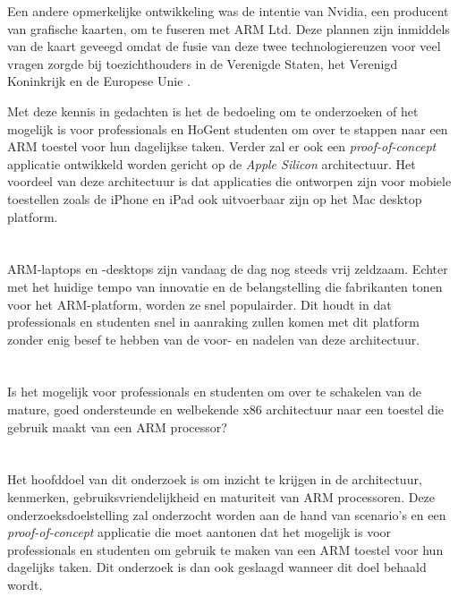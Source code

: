 Een andere opmerkelijke ontwikkeling was de intentie van Nvidia, een producent van grafische kaarten, om te fuseren met ARM Ltd. Deze plannen zijn inmiddels van de kaart geveegd omdat de fusie van deze twee technologiereuzen voor veel vragen zorgde bij toezichthouders in de Verenigde Staten, het Verenigd Koninkrijk en de Europese Unie \autocite{Dowd2022}. 

Met deze kennis in gedachten is het de bedoeling om te onderzoeken of het mogelijk is voor professionals en HoGent studenten om over te stappen naar een ARM toestel voor hun dagelijkse taken. Verder zal er ook een \textit{proof-of-concept} applicatie ontwikkeld worden gericht op de \textit{Apple Silicon} architectuur. Het voordeel van deze architectuur is dat applicaties die ontworpen zijn voor mobiele toestellen zoals de iPhone en iPad ook uitvoerbaar zijn op het Mac desktop platform.

\section{}
\label{sec:probleemstelling}

ARM-laptops en -desktops zijn vandaag de dag nog steeds vrij zeldzaam. Echter met het huidige tempo van innovatie en de belangstelling die fabrikanten tonen voor het ARM-platform, worden ze snel populairder. Dit houdt in dat professionals en studenten snel in aanraking zullen komen met dit platform zonder enig besef te hebben van de voor- en nadelen van deze architectuur. 

\section{}
\label{sec:onderzoeksvraag}

Is het mogelijk voor professionals en studenten om over te schakelen van de mature, goed ondersteunde en welbekende x86 architectuur naar een toestel die gebruik maakt van een ARM processor? 

\section{}
\label{sec:onderzoeksdoelstelling}

Het hoofddoel van dit onderzoek is om inzicht te krijgen in de architectuur, kenmerken, gebruiksvriendelijkheid en maturiteit van ARM processoren. Deze onderzoeksdoelstelling zal onderzocht worden aan de hand van scenario’s en een \textit{proof-of-concept} applicatie die moet aantonen dat het mogelijk is voor professionals en studenten om gebruik te maken van een ARM toestel voor hun dagelijks taken. Dit onderzoek is dan ook geslaagd wanneer dit doel behaald wordt.

